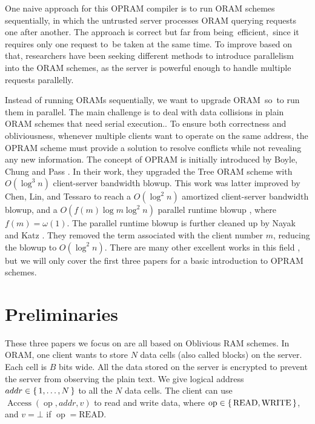 \documentclass[fontsize=11pt]{article}
\begin{document}
One naive approach for this OPRAM compiler is to run ORAM schemes sequentially, in which the untrusted server processes ORAM querying requests one after another. The approach is correct but far from being efficient, since it requires only one request to be taken at the same time. To improve based on that, researchers have been seeking different methods to introduce parallelism into the ORAM schemes, as the server is powerful enough to handle multiple requests parallelly.

Instead of running ORAMs sequentially, we want to upgrade ORAM so to run them in parallel. The main challenge is to deal with data collisions in plain ORAM schemes that need serial execution.. To ensure both correctness and obliviousness, whenever multiple clients want to operate on the same address, the OPRAM scheme must provide a solution to resolve conflicts while not revealing any new information. The concept of OPRAM is initially introduced by Boyle, Chung and Pass \cite{BCP16}. In their work, they upgraded the Tree ORAM scheme with $O(\log^3 n)$ client-server bandwidth blowup. This work was latter improved by Chen, Lin, and Tessaro to reach a $O(\log^2 n)$ amortized client-server bandwidth blowup, and a $O(f(m)\log m \log^2 n)$ parallel runtime blowup \cite{CLT16}, where $f(m) = \omega(1)$. The parallel runtime blowup is further cleaned up by Nayak and Katz \cite{NK16}. They removed the term associated with the client number $m$, reducing the blowup to $O(\log^2 n)$. There are many other excellent works in this field \cite{CS17, CNS18, OptOPRAM20}, but we will only cover the first three papers for a basic introduction to OPRAM schemes.

\section{Preliminaries}

These three papers we focus on are all based on Oblivious RAM schemes. In ORAM, one client wants to store $N$ data cells (also called blocks) on the server. Each cell is $B$ bits wide. All the data stored on the server is encrypted to prevent the server from observing the plain text. We give logical address $addr \in \set{1, \ldots, N}$ to all the $N$ data cells. The client can use $\operatorname{Access}(\operatorname{op}, addr, v)$ to read and write data, where $\operatorname{op} \in \set{ \text{READ}, \text{WRITE}}$, and $v = \bot$ if $\operatorname{op} = \text{READ}$. 
\end{document}
